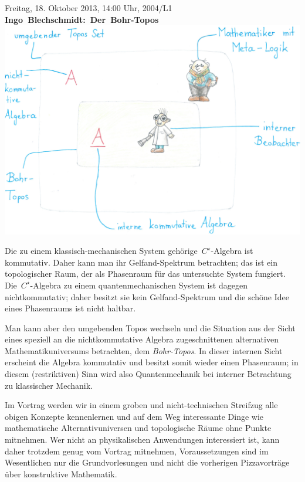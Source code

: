 \documentclass[a4paper,ngerman,landscape]{scrartcl}
\begin{document}
\begin{center}
  \huge
  Freitag, 18. Oktober 2013, 14:00 Uhr, 2004/L1 \\
  \mbox{\textbf{Ingo Blechschmidt: Der Bohr-Topos}}
  \vfill
  \includegraphics[scale=0.5]{bohr-topos}
  \vfill

  \large
  \begin{minipage}{0.8\textwidth}
    \setlength\parskip{\medskipamount}
    Die zu einem klassisch-mechanischen System gehörige~$C^\star$-Algebra ist
    kommutativ. Daher kann man ihr Gelfand-Spektrum betrachten; das ist ein
    topologischer Raum, der als Phasenraum für das untersuchte System fungiert.
    Die~$C^\star$-Algebra zu einem quantenmechanischen System ist dagegen
    nichtkommutativ; daher besitzt sie kein Gelfand-Spektrum und die schöne Idee
    eines Phasenraums ist nicht haltbar.

    Man kann aber den umgebenden Topos wechseln und die Situation aus der Sicht
    eines speziell an die nichtkommutative Algebra zugeschnittenen alternativen
    Mathematikuniversums betrachten, dem \emph{Bohr-Topos}.
    In dieser internen Sicht erscheint die Algebra kommutativ und
    besitzt somit wieder einen Phasenraum; in diesem (restriktiven) Sinn wird
    also Quantenmechanik bei interner Betrachtung zu klassischer Mechanik.

    Im Vortrag werden wir in einem groben und nicht-technischen Streifzug alle
    obigen Konzepte kennenlernen und auf dem Weg interessante Dinge wie
    mathematische Alternativuniversen und topologische Räume ohne Punkte
    mitnehmen. Wer nicht an physikalischen Anwendungen interessiert ist, kann
    daher trotzdem genug vom Vortrag mitnehmen, Voraussetzungen sind im
    Wesentlichen nur die Grundvorlesungen und nicht die vorherigen
    Pizzavorträge über konstruktive Mathematik.
  \end{minipage}
\end{center}
\end{document}
